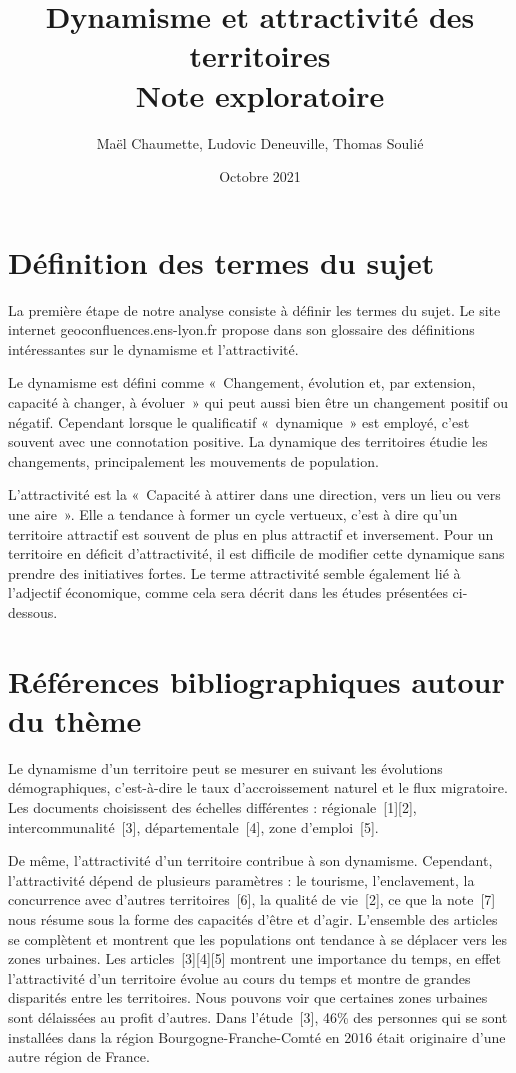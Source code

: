 \documentclass{article}
\title{Dynamisme et attractivité des territoires \\ Note exploratoire}
\author{Maël Chaumette, Ludovic Deneuville, Thomas Soulié}
\date{Octobre 2021}
\begin{document}
\maketitle

\section{Définition des termes du sujet}

La première étape de notre analyse consiste à définir les termes du sujet. Le site internet geoconfluences.ens-lyon.fr  propose dans son glossaire des définitions intéressantes sur le dynamisme et l'attractivité. 
\par
Le dynamisme est défini comme «~Changement, évolution et, par extension, capacité à changer, à évoluer~» qui peut aussi bien être un changement positif ou négatif. Cependant lorsque le qualificatif «~dynamique~» est employé, c'est souvent avec une connotation positive. La dynamique des territoires étudie les changements, principalement les mouvements de population. 

\bigbreak

\par
L'attractivité est la «~Capacité à attirer dans une direction, vers un lieu ou vers une aire~». Elle a tendance à former un cycle vertueux, c'est à dire qu'un territoire attractif est souvent de plus en plus attractif et inversement. Pour un territoire en déficit d’attractivité, il est difficile de modifier cette dynamique sans prendre des initiatives fortes.
Le terme attractivité semble également lié à l'adjectif économique, comme cela sera décrit dans les études présentées ci-dessous. 




\section{Références bibliographiques autour du thème}

Le dynamisme d'un territoire peut se mesurer en suivant les évolutions démographiques, c'est-à-dire le taux d'accroissement naturel et le flux migratoire. Les documents choisissent des échelles différentes : 
régionale~[1][2], intercommunalité~[3], départementale~[4], zone d'emploi~[5]. 

\bigbreak

De même, l'attractivité d'un territoire contribue à son dynamisme. Cependant, l'attractivité dépend de plusieurs paramètres : le tourisme, l'enclavement, la concurrence avec d'autres territoires~[6], la qualité de vie~[2], ce que la note~[7] nous résume sous la forme des capacités d'être et d'agir. L'ensemble des articles se complètent et montrent que les populations ont tendance à se déplacer vers les zones urbaines. Les articles~[3][4][5] montrent une importance du temps, en effet l'attractivité d'un territoire évolue au cours du temps et montre de grandes disparités entre les territoires. Nous pouvons voir que certaines zones urbaines sont délaissées au profit d'autres. Dans l'étude~[3], 46\% des personnes qui se sont installées dans la région Bourgogne-Franche-Comté en 2016 était originaire d'une autre région de France. 
\end{document}
